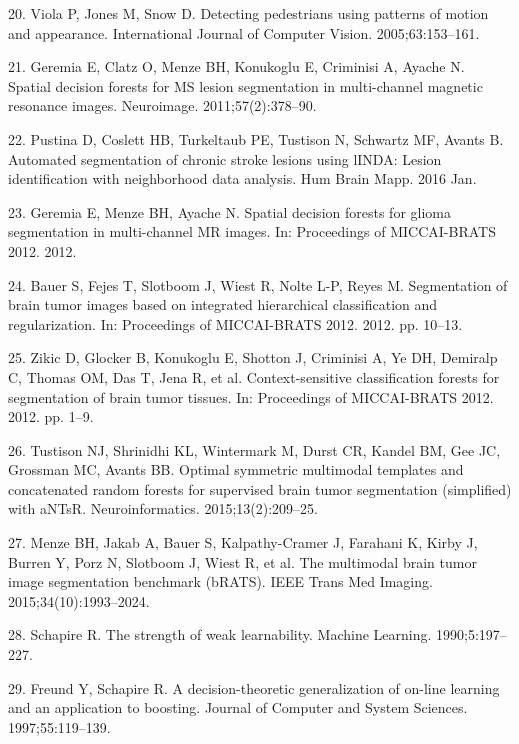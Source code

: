 \documentclass[11pt,]{article}
\begin{document}
\hypertarget{ref-viola2005}{}
20. Viola P, Jones M, Snow D. Detecting pedestrians using patterns of
motion and appearance. International Journal of Computer Vision.
2005;63:153--161.

\hypertarget{ref-geremia2011}{}
21. Geremia E, Clatz O, Menze BH, Konukoglu E, Criminisi A, Ayache N.
Spatial decision forests for MS lesion segmentation in multi-channel
magnetic resonance images. Neuroimage. 2011;57(2):378--90.

\hypertarget{ref-Pustina:2016aa}{}
22. Pustina D, Coslett HB, Turkeltaub PE, Tustison N, Schwartz MF,
Avants B. Automated segmentation of chronic stroke lesions using lINDA:
Lesion identification with neighborhood data analysis. Hum Brain Mapp.
2016 Jan.

\hypertarget{ref-geremia2012}{}
23. Geremia E, Menze BH, Ayache N. Spatial decision forests for glioma
segmentation in multi-channel MR images. In: Proceedings of MICCAI-BRATS
2012. 2012.

\hypertarget{ref-bauer2012}{}
24. Bauer S, Fejes T, Slotboom J, Wiest R, Nolte L-P, Reyes M.
Segmentation of brain tumor images based on integrated hierarchical
classification and regularization. In: Proceedings of MICCAI-BRATS 2012.
2012. pp. 10--13.

\hypertarget{ref-zikic2012}{}
25. Zikic D, Glocker B, Konukoglu E, Shotton J, Criminisi A, Ye DH,
Demiralp C, Thomas OM, Das T, Jena R, et al. Context-sensitive
classification forests for segmentation of brain tumor tissues. In:
Proceedings of MICCAI-BRATS 2012. 2012. pp. 1--9.

\hypertarget{ref-Tustison:2015aa}{}
26. Tustison NJ, Shrinidhi KL, Wintermark M, Durst CR, Kandel BM, Gee
JC, Grossman MC, Avants BB. Optimal symmetric multimodal templates and
concatenated random forests for supervised brain tumor segmentation
(simplified) with aNTsR. Neuroinformatics. 2015;13(2):209--25.

\hypertarget{ref-Menze:2015aa}{}
27. Menze BH, Jakab A, Bauer S, Kalpathy-Cramer J, Farahani K, Kirby J,
Burren Y, Porz N, Slotboom J, Wiest R, et al. The multimodal brain tumor
image segmentation benchmark (bRATS). IEEE Trans Med Imaging.
2015;34(10):1993--2024.

\hypertarget{ref-schapire1990}{}
28. Schapire R. The strength of weak learnability. Machine Learning.
1990;5:197--227.

\hypertarget{ref-freund1997}{}
29. Freund Y, Schapire R. A decision-theoretic generalization of on-line
learning and an application to boosting. Journal of Computer and System
Sciences. 1997;55:119--139.
\end{document}

